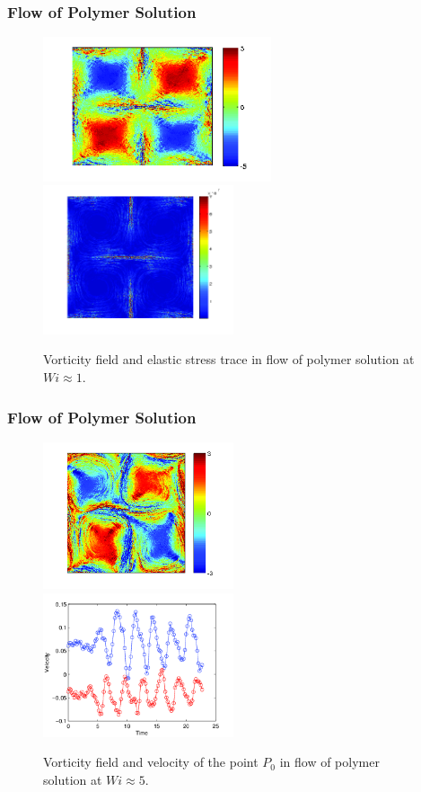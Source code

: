 \begin{frame}
  \frametitle{Flow of Polymer Solution}
  \begin{figure}
    \centering
    \includegraphics[width=0.6\textwidth]{img/polymer_loc-10.png}
  \includegraphics[width=0.5\textwidth]{img/polymer_loc-6.png}
    \caption{Vorticity field and elastic stress trace in flow of polymer solution at $Wi\approx1$.}
    \label{fig:vor_pol1}
  \end{figure}
\end{frame}

\begin{frame}
  \frametitle{Flow of Polymer Solution}
\begin{figure}[ht]
\includegraphics[width=0.5\textwidth]{img/polymer_loc-13.png}
\includegraphics[width=0.5\textwidth]{img/polymer_loc-7.png}
\caption{Vorticity field and velocity of the point $P_0$ in flow of polymer solution at $Wi\approx5$.}
\label{fug:vor_pol5}
\end{figure}
\end{frame}

